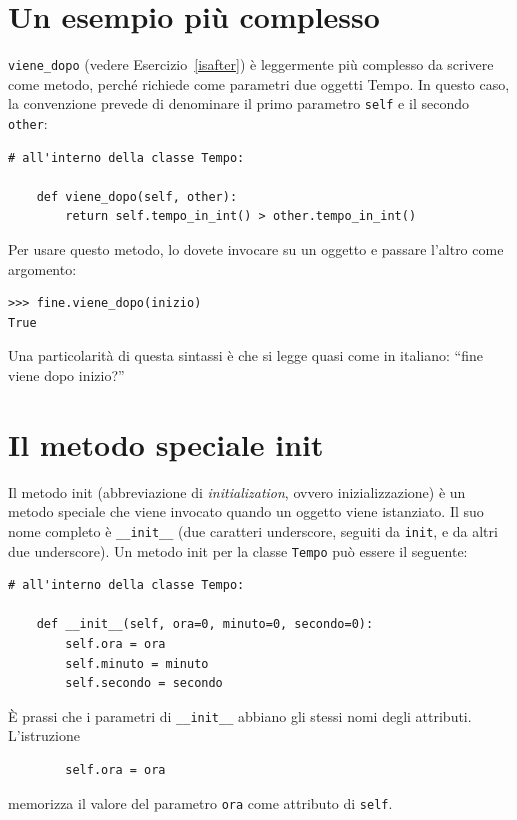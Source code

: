 \documentclass[10pt]{book}
\begin{document}
\section{Un esempio più complesso}

\verb"viene_dopo" (vedere Esercizio~\ref{isafter}) è leggermente più complesso da scrivere come metodo, perché richiede come parametri due oggetti Tempo. In questo caso, la convenzione prevede di denominare il primo parametro {\tt self} e il secondo {\tt other}:

\begin{verbatim}
# all'interno della classe Tempo:

    def viene_dopo(self, other):
        return self.tempo_in_int() > other.tempo_in_int()
\end{verbatim}
%
Per usare questo metodo, lo dovete invocare su un oggetto e passare l'altro come argomento:

\begin{verbatim}
>>> fine.viene_dopo(inizio)
True
\end{verbatim}
%
Una particolarità di questa sintassi è che si legge quasi come in italiano:
``fine viene dopo inizio?''


\section{Il metodo speciale init}

Il metodo init (abbreviazione di {\em initialization}, ovvero inizializzazione) è un metodo speciale che viene invocato quando un oggetto viene istanziato. Il suo nome completo è \verb"__init__" (due caratteri underscore, 
seguiti da {\tt init}, e da altri due  underscore). Un metodo init per la classe  {\tt Tempo} può essere il seguente:

\begin{verbatim}
# all'interno della classe Tempo:

    def __init__(self, ora=0, minuto=0, secondo=0):
        self.ora = ora
        self.minuto = minuto
        self.secondo = secondo
\end{verbatim}
%
È prassi che i parametri di \verb"__init__" abbiano gli stessi nomi degli attributi. L'istruzione

\begin{verbatim}
        self.ora = ora
\end{verbatim}
%
memorizza il valore del parametro {\tt ora} come attributo di {\tt self}.
\end{document}
